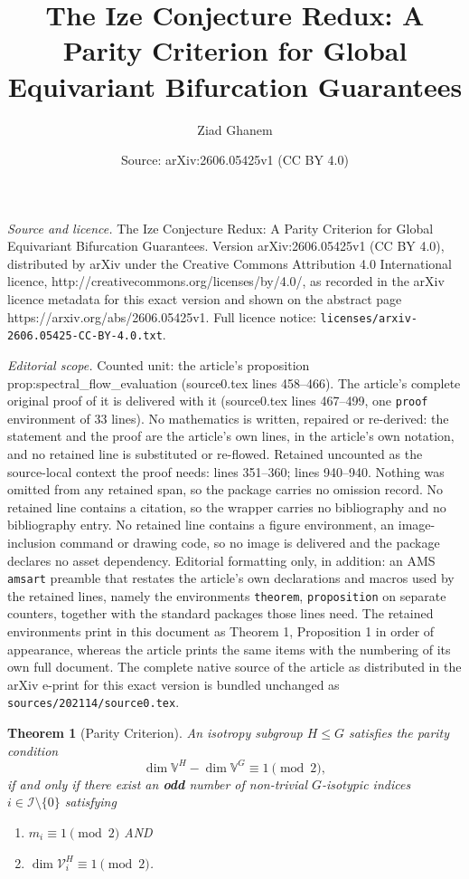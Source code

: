 \documentclass[10pt,a4paper]{amsart}
\title{The Ize Conjecture Redux: A Parity Criterion for Global Equivariant Bifurcation Guarantees}
\author{Ziad Ghanem}
\date{Source: arXiv:2606.05425v1 (CC BY 4.0)}
\newtheorem{theorem}{Theorem}
\begin{document}
\maketitle

\noindent\emph{Source and licence.} The Ize Conjecture Redux: A Parity Criterion for Global Equivariant Bifurcation Guarantees. Version arXiv:2606.05425v1 (CC BY 4.0), distributed by arXiv under the Creative Commons Attribution 4.0 International licence, http://creativecommons.org/licenses/by/4.0/, as recorded in the arXiv licence metadata for this exact version and shown on the abstract page https://arxiv.org/abs/2606.05425v1. Full licence notice: \texttt{licenses/arxiv-2606.05425-CC-BY-4.0.txt}.\par\smallskip

\noindent\textit{Editorial scope.} Counted unit: the article's proposition prop:spectral\_flow\_evaluation (source0.tex lines 458--466). The article's complete original proof of it is delivered with it (source0.tex lines 467--499, one \texttt{proof} environment of 33 lines). No mathematics is written, repaired or re-derived: the statement and the proof are the article's own lines, in the article's own notation, and no retained line is substituted or re-flowed.  Retained uncounted as the source-local context the proof needs: lines 351--360; lines 940--940.  Nothing was omitted from any retained span, so the package carries no omission record.  No retained line contains a citation, so the wrapper carries no bibliography and no bibliography entry.  No retained line contains a figure environment, an image-inclusion command or drawing code, so no image is delivered and the package declares no asset dependency.  Editorial formatting only, in addition: an AMS \texttt{amsart} preamble that restates the article's own declarations and macros used by the retained lines, namely the environments \texttt{theorem}, \texttt{proposition} on separate counters, together with the standard packages those lines need.  The retained environments print in this document as Theorem 1, Proposition 1 in order of appearance, whereas the article prints the same items with the numbering of its own full document.  The complete native source of the article as distributed in the arXiv e-print for this exact version is bundled unchanged as \texttt{sources/202114/source0.tex}.
\begin{theorem}[Parity Criterion]\label{thm:parity_guarantee}
An isotropy subgroup $H \leq G$ satisfies the parity condition
\begin{equation*}
    \dim \mathbb V^H - \dim \mathbb V^G \equiv 1 \pmod{2},
\end{equation*}
if and only if there exist an \textbf{odd} number of non-trivial $G$-isotypic indices $i \in \mathcal I \setminus \{0\}$ satisfying
\begin{enumerate}\item[(i)] $m_i \equiv 1 \pmod{2}$ AND
\item[(ii)] $\dim \mathcal V_i^H \equiv 1 \pmod{2}$.
\end{enumerate}
\end{theorem}
\end{document}
